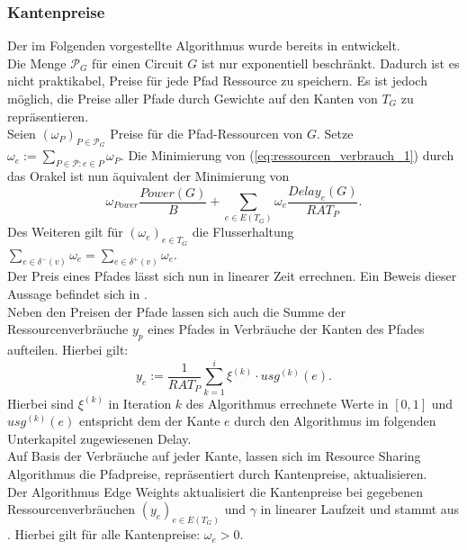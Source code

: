 \documentclass[11pt, a4paper, german]{article}
\begin{document}
\subsubsection{Kantenpreise}\label{subsubsec:kantenpreise}
Der im Folgenden vorgestellte Algorithmus wurde bereits in \cite{Daboul2018} entwickelt. \\
Die Menge $\mathcal{P}_G$ für einen Circuit $G$ ist nur exponentiell beschränkt. Dadurch ist es nicht praktikabel, Preise für jede Pfad Ressource zu speichern. Es ist jedoch möglich, die Preise aller Pfade durch Gewichte auf den Kanten von $T_G$ zu repräsentieren. \\
Seien $(\omega _P)_{P \in \mathcal{P}_G}$ Preise für die Pfad-Ressourcen von $G$. Setze $\omega _e := \sum\limits_{P \in \mathcal{P} : e \in P} \omega _P$.  Die Minimierung von (\ref{eq:ressourcen_verbrauch_1}) durch das Orakel ist nun äquivalent der Minimierung von 
\begin{equation}\label{eq:ressourcen_verbrauch_2}
\omega _{Power} \frac{Power(G)}{B} + \sum\limits_{e \in E(T_G)} \omega_e \frac{Delay_e(G)}{RAT_P}.
\end{equation}
Des Weiteren gilt für $(\omega_e)_{e \in T_G}$ die Flusserhaltung $\sum_{e \in  \delta^- (v)} \omega_e = \sum_{e \in  \delta^+ (v)} \omega_e $.\\

Der Preis eines Pfades lässt sich nun in linearer Zeit errechnen. Ein Beweis dieser Aussage befindet sich in \cite{Haehnle2015}.\\
Neben den Preisen der Pfade lassen sich auch die Summe der Ressourcenverbräuche $y_p$ eines Pfades in Verbräuche der Kanten des Pfades aufteilen. Hierbei gilt: 
\begin{equation}\label{eq:ress_verbr}
y_e := \frac{1}{RAT_P} \sum\limits_{k=1}^i \xi^{(k)} \cdot usg^{(k)}(e).
\end{equation}
Hierbei sind $\xi^{(k)}$ in Iteration $k$ des Algorithmus errechnete Werte in $[0,1]$ und $usg^{(k)}(e)$ entspricht dem der Kante $e$ durch den Algorithmus im folgenden Unterkapitel zugewiesenen Delay.\\
Auf Basis der Verbräuche auf jeder Kante, lassen sich im Resource Sharing Algorithmus die Pfadpreise, repräsentiert durch Kantenpreise,  aktualisieren. \\

Der Algorithmus Edge Weights aktualisiert die Kantenpreise bei gegebenen Ressourcenverbräuchen $(y_e)_{e\in E(T_G)}$ und $\gamma$ in linearer Laufzeit und stammt aus \cite{Daboul2018}. Hierbei gilt für alle Kantenpreise: $\omega_e > 0$. 
\end{document}
